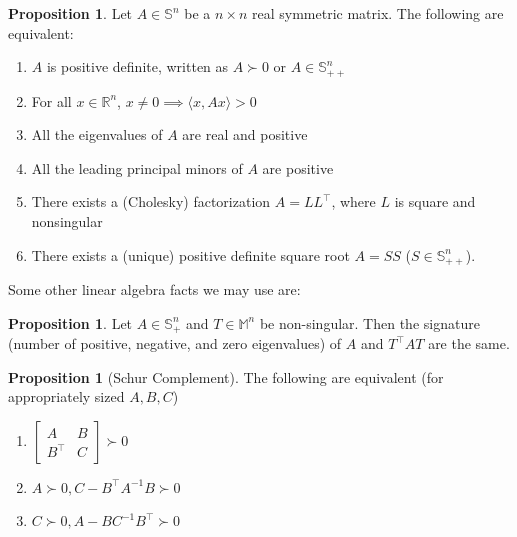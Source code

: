 \documentclass[11pt]{article}
\numberwithin{equation}{section}
\theoremstyle{definition}
\newtheorem{proposition}[theorem]{Proposition}
\newcommand{\bM}{\mathbb{M}}
\newcommand{\bR}{\mathbb{R}}
\newcommand{\bS}{\mathbb{S}}
\begin{document}
\begin{proposition}
    Let $A\in\bS^n$ be a $n\times n$ real symmetric matrix. The following are equivalent:
    \begin{enumerate}[label=(\roman*)]
        \item $A$ is positive definite, written as $A\succ 0$ or $A\in\bS_{++}^n$
        \item For all $x\in\bR^n$, $x\neq 0\implies \langle x, Ax\rangle>0$
        \item All the eigenvalues of $A$ are real and positive
        \item All the leading principal minors of $A$ are positive
        \item There exists a (Cholesky) factorization $A=LL^\top$, where $L$ is square and nonsingular
        \item There exists a (unique) positive definite square root $A=SS$ ($S\in\bS_{++}^n$).
    \end{enumerate}
\end{proposition}
Some other linear algebra facts we may use are:
\begin{proposition}
    Let $A\in\bS_+^n$ and $T\in\bM^n$ be non-singular. Then the signature (number of positive, negative, and zero eigenvalues) of $A$ and $T^\top AT$ are the same.
\end{proposition}
\begin{proposition}[Schur Complement]
    The following are equivalent (for appropriately sized $A, B, C$)
    \begin{enumerate}[label=(\roman*)]
        \item $\begin{bmatrix}
        A&B\\B^\top& C
        \end{bmatrix}\succ 0$
        \item $A\succ 0, C-B^\top A^{-1}B\succ0$
        \item $C\succ 0, A-B C^{-1}B^\top\succ0$
    \end{enumerate}
\end{proposition}
\end{document}
